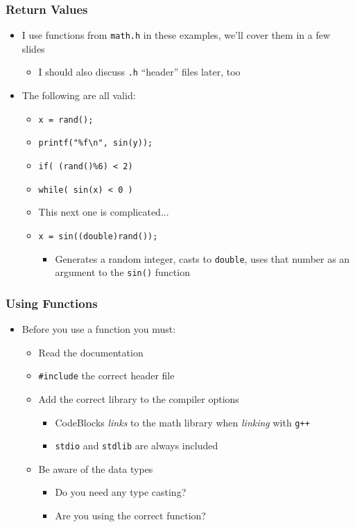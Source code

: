 \documentclass[14pt]{beamer}
\begin{document}
\begin{frame}
\frametitle{Return Values}
\begin{itemize}
\item I use functions from \texttt{math.h} in these examples, we'll cover them in a few slides
	\begin{itemize}
		\item I should also discuss \texttt{.h} ``header'' files later, too
	\end{itemize}
\pause
\item The following are all valid:
	\begin{itemize}
		\item \texttt{x = rand();}
		\item \texttt{printf("\%f\textbackslash n", sin(y));}
		\item \texttt{if( (rand()\%6) < 2)}
		\item \texttt{while( sin(x) < 0 )}
		\pause
		\item This next one is complicated...
		\pause
		\item \texttt{x = sin((double)rand());}
			\begin{itemize}
			\pause
				\item Generates a random integer, casts to \texttt{double}, uses that number as an argument to the \texttt{sin()} function
			\end{itemize}
	\end{itemize}
\end{itemize}
\end{frame}

\begin{frame}
\frametitle{Using Functions}
\begin{itemize}
\item Before you use a function you must:
	\begin{itemize}
		\item Read the documentation
		\item \texttt{\#include} the correct header file
		\item Add the correct library to the compiler options
			\begin{itemize}
				\item CodeBlocks \textit{links} to the math library when \textit{linking} with \texttt{g++}
				\item \texttt{stdio} and \texttt{stdlib} are always included
			\end{itemize}
		\item Be aware of the data types
			\begin{itemize}
				\item Do you need any type casting?
				\item Are you using the correct function?
			\end{itemize}
	\end{itemize}
\end{itemize}
\end{frame}
\end{document}

